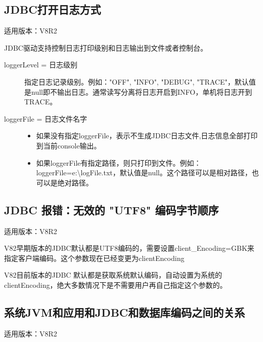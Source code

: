 \documentclass[letterpaper,10pt,english]{sphinxmanual}
\begin{document}
\subsection{JDBC打开日志方式}
\label{\detokenize{interface/jdbc:id11}}
适用版本：V8R2

JDBC驱动支持控制日志打印级别和日志输出到文件或者控制台。

\begin{description}
\item[{loggerLevel = 日志级别}] \leavevmode
指定日志记录级别。例如："OFF", "INFO", "DEBUG", "TRACE"，默认值是null即不输出日志。通常读写分离将日志开启到INFO，单机将日志开到TRACE。

\end{description}

\begin{description}
\item[{loggerFile = 日志文件名字}] \leavevmode
{}
\begin{itemize}
\item {} 
如果没有指定loggerFile，表示不生成JDBC日志文件,日志信息全部打印到当前console输出。

\item {} 
如果loggerFile有指定路径，则只打印到文件。例如：loggerFile=e:\textbackslash{}logFile.txt，默认值是null。这个路径可以是相对路径，也可以是绝对路径。

\end{itemize}

\end{description}


\subsection{JDBC 报错：无效的 "UTF8" 编码字节顺序}
\label{\detokenize{interface/jdbc:jdbc-utf8}}
适用版本：V8R2

V82早期版本的JDBC默认都是UTF8编码的，需要设置client\_Encoding=GBK来指定客户端编码。这个参数现在已经变更为clientEncoding

V82目前版本的JDBC 默认都是获取系统默认编码，自动设置为系统的clientEncoding，绝大多数情况下是不需要用户再自己指定这个参数的。


\subsection{系统JVM和应用和JDBC和数据库编码之间的关系}
\label{\detokenize{interface/jdbc:jvmjdbc}}
适用版本：V8R2
\end{document}
